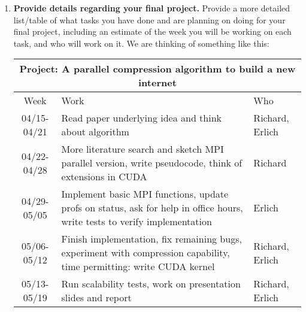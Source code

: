 \documentclass[12pt]{article}
\begin{document}
\begin{enumerate}
\item {\bf Provide details regarding your final project.}
  Provide a more detailed list/table of what tasks you have done and are planning on
  doing for your final project, including an estimate of the  week
  you will be working on each task, and who will work on it. We are
  thinking of something like this:
  \begin{center}
  \begin{tabular} {|c|p{9cm}|p{2cm}|}
    \hline
    \multicolumn{3}{|c|}{\bf Project: A parallel compression algorithm
      to build a new internet} \\
    \hline
    Week & Work & Who  \\ \hline \hline
    04/15-04/21 & Read paper underlying idea and think about
    algorithm & Richard, Erlich \\ \hline
    04/22-04/28 & More literature search and sketch MPI parallel
    version, write pseudocode, think of extensions in CUDA  & Richard \\ \hline
    04/29-05/05 &  Implement basic MPI functions, update profs on
    status, ask for help in office hours, write tests to verify
    implementation & Erlich\\ \hline
    05/06-05/12 & Finish implementation, fix remaining bugs,
    experiment with compression capability, time permitting: write
    CUDA kernel & Richard, Erlich \\ \hline
    05/13-05/19 & Run scalability tests, work on
    presentation slides and report  & Richard, Erlich \\ \hline
  \end{tabular}
  \end{center}



\end{enumerate}
\end{document}
